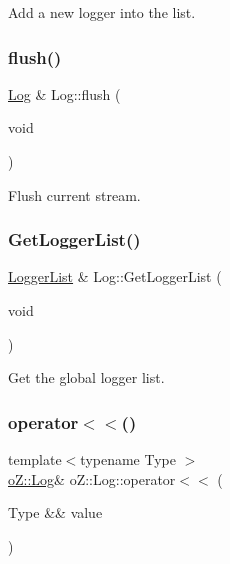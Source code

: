 Add a new logger into the list. 

\mbox{\label{classo_z_1_1_log_a41c8972eca682eb2701126b43a2f9099}} 
\subsubsection{\texorpdfstring{flush()}{flush()}}
{\footnotesize\ttfamily \mbox{\hyperlink{classo_z_1_1_log}{Log}} \& Log\+::flush (\begin{DoxyParamCaption}\item[{void}]{ }\end{DoxyParamCaption})}



Flush current stream. 

\mbox{\label{classo_z_1_1_log_aa1c737e66220f5f6f2f557c054b44e48}} 
\subsubsection{\texorpdfstring{GetLoggerList()}{GetLoggerList()}}
{\footnotesize\ttfamily \mbox{\hyperlink{namespaceo_z_a2d18a70272709242e8e7ebffc3f1806c}{Logger\+List}} \& Log\+::\+Get\+Logger\+List (\begin{DoxyParamCaption}\item[{void}]{ }\end{DoxyParamCaption})\hspace{0.3cm}{\ttfamily [static]}}



Get the global logger list. 

\mbox{\label{classo_z_1_1_log_ab4b6199f686c0b32f40be8885fca9db0}} 
\subsubsection{\texorpdfstring{operator$<$$<$()}{operator<<()}\hspace{0.1cm}{\footnotesize\ttfamily [1/2]}}
{\footnotesize\ttfamily template$<$typename Type $>$ \\
\mbox{\hyperlink{classo_z_1_1_log}{o\+Z\+::\+Log}}\& o\+Z\+::\+Log\+::operator$<$$<$ (\begin{DoxyParamCaption}\item[{Type \&\&}]{value }\end{DoxyParamCaption})}

